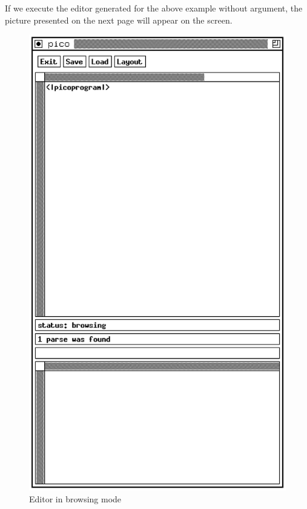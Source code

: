 If we execute the editor generated for the above example without
argument, the picture presented on the next page will appear on
the screen.
\begin {figure}[t]
\begin {center}
\includegraphics[bb = 150 125 460 665]{pico.eps}
\end {center}
\caption{Editor in browsing mode}
\end {figure}
\clearpage

